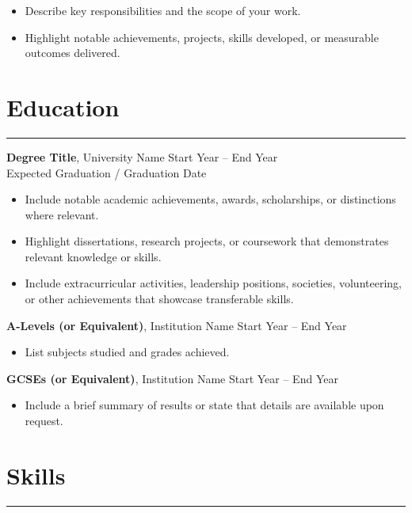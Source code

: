 \documentclass[12pt,a4paper]{report}
\newcommand{\resumeItem}[1]{\item #1}
\newcommand{\resumeSection}[1]{\section*{\Large\bfseries #1}\vspace{-0.5em}\hrule\vspace{0.2em}}
\begin{document}
\begin{itemize}[leftmargin=*]
    \resumeItem{Describe key responsibilities and the scope of your work.}
    
    \resumeItem{Highlight notable achievements, projects, skills developed,
    or measurable outcomes delivered.}
\end{itemize}

\resumeSection{Education}

\textbf{Degree Title}, University Name \hfill Start Year -- End Year\\
Expected Graduation / Graduation Date

\begin{itemize}
    \item Include notable academic achievements, awards, scholarships, or
          distinctions where relevant.
    \item Highlight dissertations, research projects, or coursework that
          demonstrates relevant knowledge or skills.
    \item Include extracurricular activities, leadership positions, societies,
          volunteering, or other achievements that showcase transferable skills.
\end{itemize}

\vspace{1em}

\textbf{A-Levels (or Equivalent)}, Institution Name \hfill Start Year -- End Year

\begin{itemize}
    \item List subjects studied and grades achieved.
\end{itemize}

\vspace{1em}

\textbf{GCSEs (or Equivalent)}, Institution Name \hfill Start Year -- End Year

\begin{itemize}
    \item Include a brief summary of results or state that details are available
          upon request.
\end{itemize}


\resumeSection{Skills}
\end{document}
